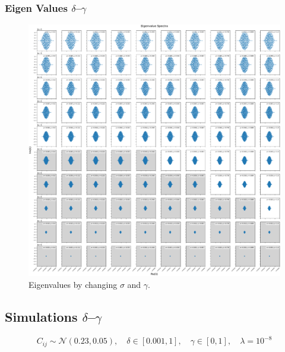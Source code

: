 \documentclass{article}
\begin{document}
\clearpage

\subsubsection{Eigen Values $\delta$–$\gamma$}

\begin{figure}[H]
    \centering
    \includegraphics[width=\linewidth]{SigmaGamma/EigenvalueSpectraLog.pdf}
    \caption{Eigenvalues by changing $\sigma$ and $\gamma$.}
\end{figure}

\clearpage

\subsection{Simulations $\delta$–$\gamma$}

\[
C_{ij} \sim \mathcal{N}(0.23, 0.05), \quad 
\delta \in [0.001, 1], \quad 
\gamma \in [0, 1], \quad \lambda = 10^{-8}
\]
\end{document}
